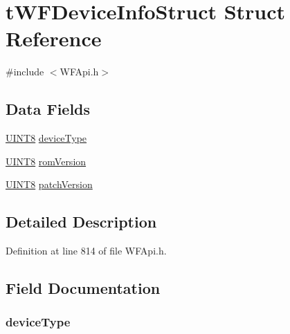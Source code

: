 \hypertarget{structt_w_f_device_info_struct}{}\section{t\+W\+F\+Device\+Info\+Struct Struct Reference}
\label{structt_w_f_device_info_struct}


{\ttfamily \#include $<$W\+F\+Api.\+h$>$}

\subsection*{Data Fields}
\begin{DoxyCompactItemize}
\item 
\hyperlink{_generic_type_defs_8h_ab27e9918b538ce9d8ca692479b375b6a}{U\+I\+N\+T8} \hyperlink{structt_w_f_device_info_struct_a0bd019e2ce1143e89c4184b19b54aedf}{device\+Type}
\item 
\hyperlink{_generic_type_defs_8h_ab27e9918b538ce9d8ca692479b375b6a}{U\+I\+N\+T8} \hyperlink{structt_w_f_device_info_struct_a1758eb82a8eb37ccf844cf3f3470178d}{rom\+Version}
\item 
\hyperlink{_generic_type_defs_8h_ab27e9918b538ce9d8ca692479b375b6a}{U\+I\+N\+T8} \hyperlink{structt_w_f_device_info_struct_a772cbaf7608e498b809d9ee667bd5b36}{patch\+Version}
\end{DoxyCompactItemize}


\subsection{Detailed Description}


Definition at line 814 of file W\+F\+Api.\+h.



\subsection{Field Documentation}
\hypertarget{structt_w_f_device_info_struct_a0bd019e2ce1143e89c4184b19b54aedf}{}
\subsubsection[{device\+Type}]{ device\+Type}\label{structt_w_f_device_info_struct_a0bd019e2ce1143e89c4184b19b54aedf}


